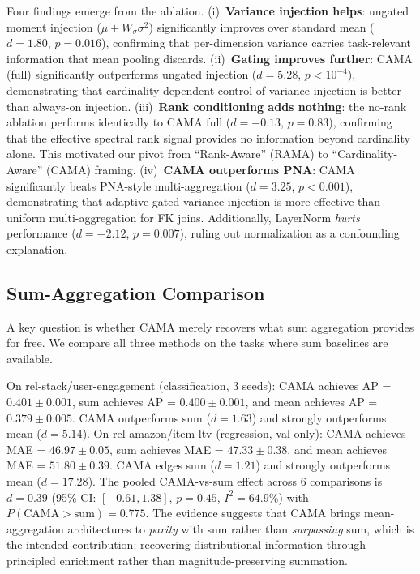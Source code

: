 \documentclass[11pt,letterpaper]{article}
\begin{document}
Four findings emerge from the ablation. (i)~\textbf{Variance injection helps}: ungated moment injection ($\mu + W_\sigma \sigma^2$) significantly improves over standard mean ($d = 1.80$, $p = 0.016$), confirming that per-dimension variance carries task-relevant information that mean pooling discards. (ii)~\textbf{Gating improves further}: CAMA (full) significantly outperforms ungated injection ($d = 5.28$, $p < 10^{-4}$), demonstrating that cardinality-dependent control of variance injection is better than always-on injection. (iii)~\textbf{Rank conditioning adds nothing}: the no-rank ablation performs identically to CAMA full ($d = -0.13$, $p = 0.83$), confirming that the effective spectral rank signal provides no information beyond cardinality alone. This motivated our pivot from ``Rank-Aware'' (RAMA) to ``Cardinality-Aware'' (CAMA) framing. (iv)~\textbf{CAMA outperforms PNA}: CAMA significantly beats PNA-style multi-aggregation ($d = 3.25$, $p < 0.001$), demonstrating that adaptive gated variance injection is more effective than uniform multi-aggregation for FK joins. Additionally, LayerNorm \emph{hurts} performance ($d = -2.12$, $p = 0.007$), ruling out normalization as a confounding explanation.

\subsection{Sum-Aggregation Comparison}
\label{sec:sum_comparison}

A key question is whether CAMA merely recovers what sum aggregation provides for free. We compare all three methods on the tasks where sum baselines are available.

On rel-stack/user-engagement (classification, 3 seeds): CAMA achieves AP = $0.401 \pm 0.001$, sum achieves AP = $0.400 \pm 0.001$, and mean achieves AP = $0.379 \pm 0.005$. CAMA outperforms sum ($d = 1.63$) and strongly outperforms mean ($d = 5.14$). On rel-amazon/item-ltv (regression, val-only): CAMA achieves MAE = $46.97 \pm 0.05$, sum achieves MAE = $47.33 \pm 0.38$, and mean achieves MAE = $51.80 \pm 0.39$. CAMA edges sum ($d = 1.21$) and strongly outperforms mean ($d = 17.28$). The pooled CAMA-vs-sum effect across 6 comparisons is $d = 0.39$ (95\% CI: $[-0.61, 1.38]$, $p = 0.45$, $I^2 = 64.9\%$) with $P(\text{CAMA} > \text{sum}) = 0.775$. The evidence suggests that CAMA brings mean-aggregation architectures to \emph{parity} with sum rather than \emph{surpassing} sum, which is the intended contribution: recovering distributional information through principled enrichment rather than magnitude-preserving summation.
\end{document}
